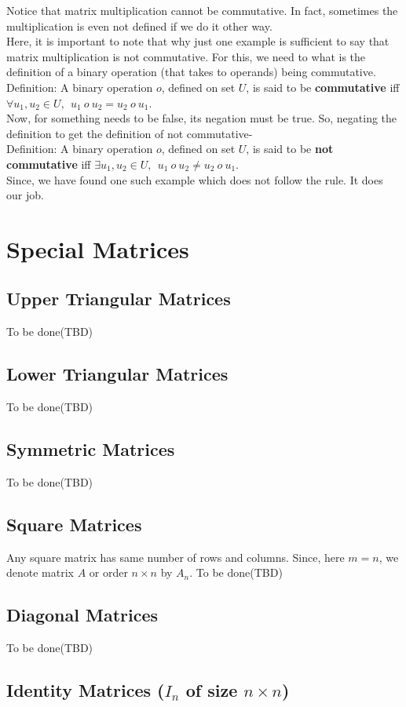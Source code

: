 \documentclass{article}
\begin{document}
Notice that matrix multiplication cannot be commutative. In fact, sometimes the multiplication is even not defined if we do it other way.\\
Here, it is important to note that why just one example is sufficient to say that matrix multiplication is not commutative. For this, we need to what is the definition of a binary operation (that takes to operands) being commutative. \\
Definition: A binary operation \(o\), defined on set \(U\), is said to be \textbf{commutative} iff \(\forall u_1,u_2 \in U,~~u_1~o~u_2 = u_2~o~u_1\).\\
Now, for something needs to be false, its negation must be true. So, negating the definition to get the definition of not commutative-\\
Definition: A binary operation \(o\), defined on set \(U\), is said to be \textbf{not commutative} iff \(\exists u_1,u_2 \in U,~~u_1~o~u_2 \ne u_2~o~u_1\).\\
Since, we have found one such example which does not follow the rule. It does our job.
\section{Special Matrices}
\subsection{Upper Triangular Matrices}
To be done(TBD)
\subsection{Lower Triangular Matrices}
To be done(TBD)
\subsection{Symmetric Matrices}
To be done(TBD)
\subsection{Square Matrices}
Any square matrix has same number of rows and columns. Since, here \(m=n\), we denote matrix \(A\) or order \(n\times n\) by \(A_n\). To be done(TBD)
\subsection{Diagonal Matrices}
To be done(TBD)
\subsection{Identity Matrices (\(I_n\) of size \(n\times n\))}
\end{document}
